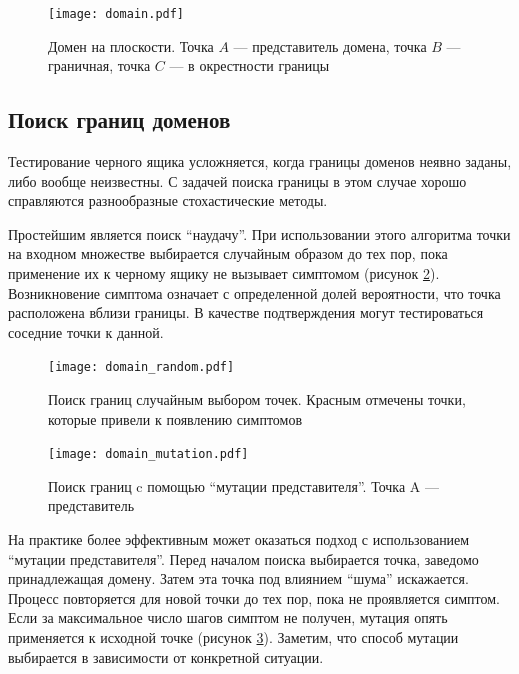 \documentclass[a4paper,14pt,href]{article}
\begin{document}
\begin{figure}[htbp]
\begin{center}
	\texttt{[image: domain.pdf]}
    \caption{Домен на плоскости. Точка $A$ --- представитель домена, точка $B$ --- граничная, точка $C$ --- в окрестности границы}
    \label{fig:DomainTest}
\end{center}
\end{figure}

\subsection{Поиск границ доменов}
	Тестирование черного ящика усложняется, когда границы доменов неявно заданы, либо вообще неизвестны. С задачей поиска границы в этом случае хорошо справляются разнообразные стохастические методы\cite{BasaezFuzzing}.

	Простейшим является поиск ``наудачу''. При использовании этого алгоритма точки на входном множестве выбирается случайным образом до тех пор, пока применение их к черному ящику не вызывает симптомом (рисунок \ref{fig:DomainRandom}). Возникновение симптома означает с определенной долей вероятности, что точка расположена вблизи границы. В качестве подтверждения могут тестироваться соседние точки к данной.
	
\begin{figure}[htbp]
\begin{center}
	\texttt{[image: domain\_random.pdf]}
    \caption{Поиск границ случайным выбором точек. Красным отмечены точки, которые привели к появлению симптомов}
    \label{fig:DomainRandom}
\end{center}
\end{figure}

\begin{figure}[htbp]
\begin{center}
	\texttt{[image: domain\_mutation.pdf]}
    \caption{Поиск границ c помощью ``мутации представителя''. Точка A --- представитель}
    \label{fig:DomainMutation}
\end{center}
\end{figure}

	На практике более эффективным может оказаться подход с использованием ``мутации представителя''. Перед началом поиска выбирается точка, заведомо принадлежащая домену. Затем эта точка под влиянием ``шума'' искажается. Процесс повторяется для новой точки до тех пор, пока не проявляется симптом. Если за максимальное число шагов симптом не получен, мутация опять применяется к исходной точке (рисунок \ref{fig:DomainMutation}).
Заметим, что способ мутации выбирается в зависимости от конкретной ситуации.
\end{document}
